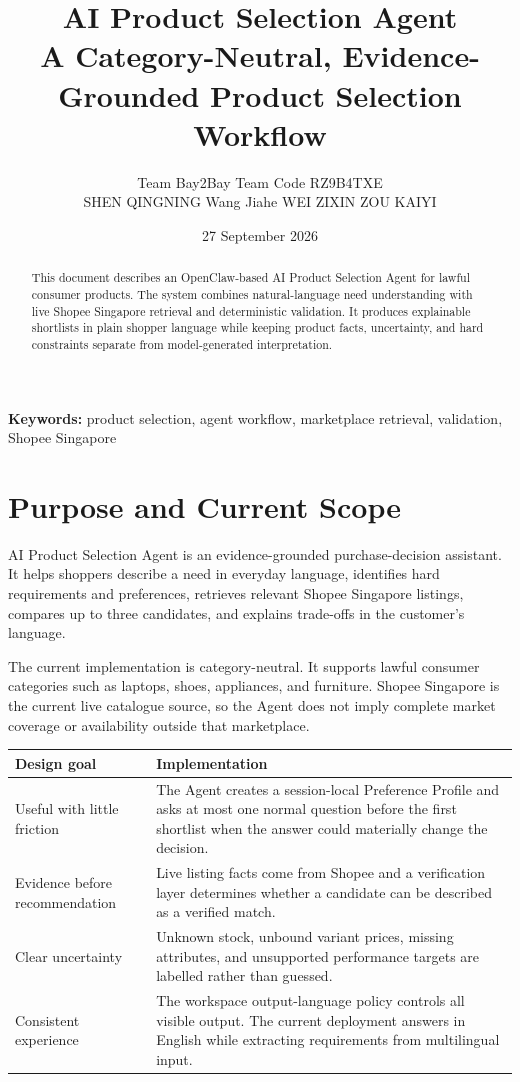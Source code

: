 \documentclass[11pt,letterpaper]{article}
\title{\bfseries AI Product Selection Agent\\[0.35em]\large A Category-Neutral, Evidence-Grounded Product Selection Workflow}
\author{\normalsize Team Bay2Bay \quad Team Code RZ9B4TXE\\[0.25em]
\small SHEN QINGNING \quad Wang Jiahe \quad WEI ZIXIN \quad ZOU KAIYI}
\date{\small 27 September 2026}
\newcommand{\thead}[1]{\bfseries\centering #1\arraybackslash}
\begin{document}
\maketitle
\thispagestyle{plain}

\begin{abstract}
This document describes an OpenClaw-based AI Product Selection Agent for lawful consumer products. The system combines natural-language need understanding with live Shopee Singapore retrieval and deterministic validation. It produces explainable shortlists in plain shopper language while keeping product facts, uncertainty, and hard constraints separate from model-generated interpretation.
\end{abstract}

\noindent\textbf{Keywords:} product selection, agent workflow, marketplace retrieval, validation, Shopee Singapore

\section{Purpose and Current Scope}

AI Product Selection Agent is an evidence-grounded purchase-decision assistant. It helps shoppers describe a need in everyday language, identifies hard requirements and preferences, retrieves relevant Shopee Singapore listings, compares up to three candidates, and explains trade-offs in the customer's language.

The current implementation is category-neutral. It supports lawful consumer categories such as laptops, shoes, appliances, and furniture. Shopee Singapore is the current live catalogue source, so the Agent does not imply complete market coverage or availability outside that marketplace.

\begin{tabularx}{\textwidth}{@{}p{1.62in}Y@{}}
\thead{Design goal} & \thead{Implementation} \\
\toprule
Useful with little friction & The Agent creates a session-local Preference Profile and asks at most one normal question before the first shortlist when the answer could materially change the decision. \\
Evidence before recommendation & Live listing facts come from Shopee and a verification layer determines whether a candidate can be described as a verified match. \\
Clear uncertainty & Unknown stock, unbound variant prices, missing attributes, and unsupported performance targets are labelled rather than guessed. \\
Consistent experience & The workspace output-language policy controls all visible output. The current deployment answers in English while extracting requirements from multilingual input. \\
\bottomrule
\end{tabularx}
\end{document}
